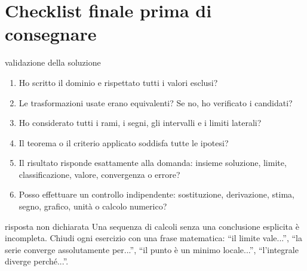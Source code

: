 \chapter*{Checklist finale prima di consegnare}

\begin{controllofinale}{validazione della soluzione}
\begin{enumerate}
\item Ho scritto il dominio e rispettato tutti i valori esclusi?
\item Le trasformazioni usate erano equivalenti? Se no, ho verificato i candidati?
\item Ho considerato tutti i rami, i segni, gli intervalli e i limiti laterali?
\item Il teorema o il criterio applicato soddisfa tutte le ipotesi?
\item Il risultato risponde esattamente alla domanda: insieme soluzione, limite, classificazione, valore, convergenza o errore?
\item Posso effettuare un controllo indipendente: sostituzione, derivazione, stima, segno, grafico, unità o calcolo numerico?
\end{enumerate}
\end{controllofinale}

\begin{errorefrequente}{risposta non dichiarata}
Una sequenza di calcoli senza una conclusione esplicita è incompleta. Chiudi ogni esercizio con una frase matematica: ``il limite vale...'', ``la serie converge assolutamente per...'', ``il punto è un minimo locale...'', ``l'integrale diverge perché...''.
\end{errorefrequente}
